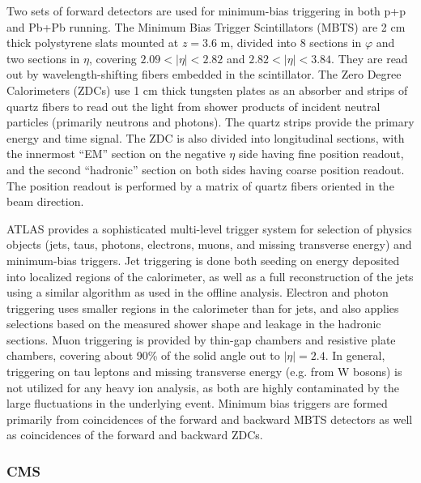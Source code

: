 Two sets of forward detectors are used for minimum-bias triggering in both
p+p and Pb+Pb running.  The Minimum Bias Trigger Scintillators (MBTS) are
2 cm thick polystyrene slats mounted at $z=3.6$ m, divided into 8 sections in
$\varphi$ and two sections in $\eta$, covering $2.09<|\eta|<2.82$ and
$2.82<|\eta|<3.84$.  They are read out by wavelength-shifting fibers embedded
in the scintillator.
The Zero Degree Calorimeters (ZDCs) use 1 cm thick tungsten plates as an absorber and strips
of quartz fibers to read out the light from shower products of incident neutral
particles (primarily neutrons and photons).
The quartz strips provide the primary energy and time signal.
The ZDC is also divided into longitudinal sections, with the innermost ``EM'' section
on the negative $\eta$ side having fine position readout, and the second
``hadronic'' section on both sides having coarse position readout.
The position readout is performed by a matrix of quartz fibers oriented in the beam
direction.

ATLAS provides a sophisticated multi-level trigger system for
selection of physics objects (jets, taus, photons, electrons, muons,
and missing transverse energy) and minimum-bias triggers.
Jet triggering is done both seeding on energy deposited into localized
regions of the calorimeter, as well as a full reconstruction of the jets
using a similar algorithm as used in the offline analysis.
Electron and photon triggering uses smaller regions in the calorimeter
than for jets, and also applies selections based on the measured shower
shape and leakage in the hadronic sections.
Muon triggering is provided by thin-gap chambers and resistive plate chambers,
covering about 90\% of the solid angle out to $|\eta|=2.4$.
In general, triggering on tau leptons and missing transverse energy (e.g.
from W bosons) is not utilized for any heavy ion analysis, as both
are highly contaminated by the large fluctuations in the
underlying event.
Minimum bias triggers are formed primarily from coincidences of the forward
and backward MBTS detectors as well as coincidences of the forward and backward
ZDCs.

\subsubsection{CMS}

